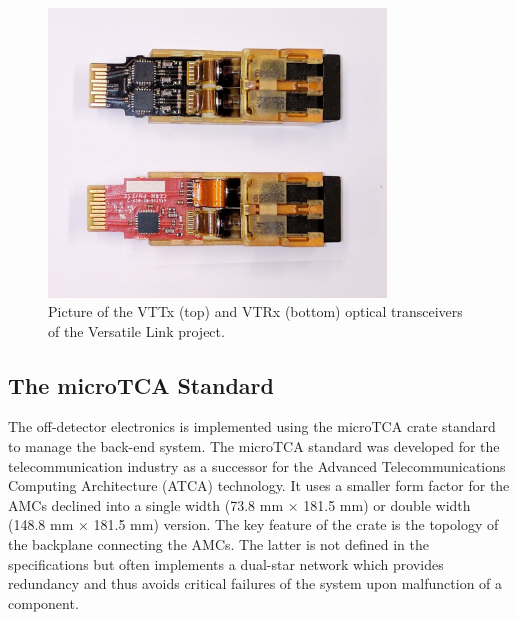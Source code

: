       \begin{figure}[h!]
        \centering
        \includegraphics[width=0.8\textwidth]{img/II-2-daq/versatile.jpg}
        \caption{Picture of the VTTx (top) and VTRx (bottom) optical transceivers of the Versatile Link project.}
        \label{fig:II-2-versatile}
      \end{figure}

    \subsection{The microTCA Standard}

      The off-detector electronics is implemented using the microTCA crate standard to manage the back-end system. The microTCA standard was developed for the telecommunication industry as a successor for the Advanced Telecommunications Computing Architecture (ATCA) technology. It uses a smaller form factor for the AMCs declined into a single width (73.8 mm $ \times $ 181.5 mm) or double width (148.8 mm $ \times $ 181.5 mm) version. The key feature of the crate is the topology of the backplane connecting the AMCs. The latter is not defined in the specifications but often implements a dual-star network which provides redundancy and thus avoids critical failures of the system upon malfunction of a component. \\

